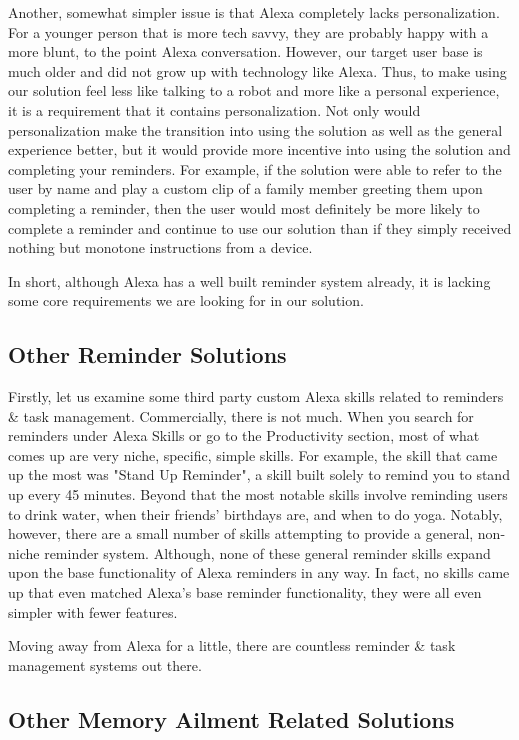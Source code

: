 \documentclass[11pt, oneside]{article}
\begin{document}
Another, somewhat simpler issue is that Alexa completely lacks personalization. 
For a younger person that is more tech savvy, they are probably happy with a more blunt, to the point Alexa conversation. 
However, our target user base is much older and did not grow up with technology like Alexa. 
Thus, to make using our solution feel less like talking to a robot and more like a personal experience, it is a requirement that it contains personalization. 
Not only would personalization make the transition into using the solution as well as the general experience better, but it would provide more incentive into using the solution and completing your reminders. 
For example, if the solution were able to refer to the user by name and play a custom clip of a family member greeting them upon completing a reminder, then the user would most definitely be more likely to complete a reminder and continue to use our solution than if they simply received nothing but monotone instructions from a device. 

In short, although Alexa has a well built reminder system already, it is lacking some core requirements we are looking for in our solution. 

\subsection{Other Reminder Solutions}

Firstly, let us examine some third party custom Alexa skills related to reminders \& task management. 
Commercially, there is not much. 
When you search for reminders under Alexa Skills or go to the Productivity section, most of what comes up are very niche, specific, simple skills. 
For example, the skill that came up the most was "Stand Up Reminder", a skill built solely to remind you to stand up every 45 minutes. 
Beyond that the most notable skills involve reminding users to drink water, when their friends' birthdays are, and when to do yoga. 
Notably, however, there are a small number of skills attempting to provide a general, non-niche reminder system. 
Although, none of these general reminder skills expand upon the base functionality of Alexa reminders in any way. 
In fact, no skills came up that even matched Alexa's base reminder functionality, they were all even simpler with fewer features. 

Moving away from Alexa for a little, there are countless reminder \& task management systems out there. 

\subsection{Other Memory Ailment Related Solutions}
\end{document}
